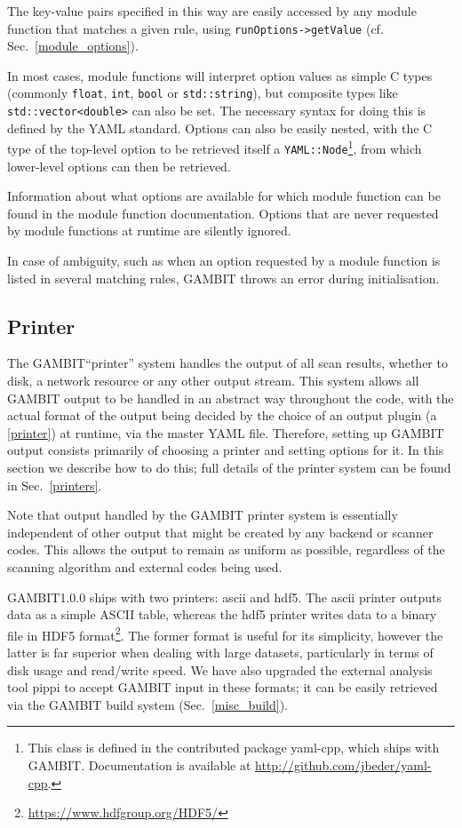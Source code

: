 \documentclass[pdftex,twocolumn,epjc3_preprint,runningheads]{svjour3}
\renewcommand{\_}{\discretionary{\underscore}{}{\underscore}}
\newcommand\cpp[1]{{\lstinline!#1!}}  %
\newcommand{\cross}[1]{\ref{#1}}
\newcommand{\gambit}{\textsf{GAMBIT}\xspace}
\newcommand{\GB}{\gambit}
\newcommand\pippi{\textsf{pippi}\xspace}
\newcommand\xx{\raisebox{0.2ex}{\smaller ++}\xspace}
\newcommand\Cpp{\textsf{C\xx}\xspace}
\newcommand\YAML{\textsf{YAML}\xspace}
\begin{document}
The key-value pairs specified in this way are
easily accessed by any module function that matches a given rule, using
\lstinline{runOptions->getValue} (cf. Sec.~\ref{module_options}).

In most cases, module functions will interpret option values as simple \Cpp types (commonly
\cpp{float}, \cpp{int}, \cpp{bool} or \cpp{std::string}), but composite
types like \cpp{std::vector<double>} can also be set.  The necessary syntax for doing this is defined by the \YAML standard.  Options can also be easily nested, with the \Cpp type of the top-level option to be retrieved itself a \cpp{YAML::Node}\footnote{This class is defined in the contributed package \textsf{yaml-cpp}, which ships with \GB.  Documentation is available at \href{http://github.com/jbeder/yaml-cpp}{http://github.com/jbeder/yaml-cpp}.}, from which lower-level options can then be retrieved.

Information about what options are available for which module function can be
found in the module function documentation.  Options that are never requested by module functions at runtime are silently ignored.

In case of ambiguity, such as when an option requested by a module function is
listed in several matching rules, \GB throws an error during initialisation.

\subsection{Printer}
\label{printer_setup}
%
The \GB ``printer'' system handles the output of all scan results, whether to disk, a network resource or any other output stream.  This system allows all \GB output to be handled in an abstract way throughout the code, with the actual format of the output being decided by the choice of an output plugin (a \cross{printer}) at runtime, via the master \YAML file.  Therefore, setting up \GB output consists primarily of choosing a printer and setting options for it.  In this section we describe how to do this; full details of the printer system can be found in Sec.\ \ref{printers}.

Note that output handled by the \GB printer system is essentially independent of other output that might be created by any backend or scanner codes. This allows the output to remain as uniform as possible, regardless of the scanning algorithm and external codes being used.

\GB \textsf{1.0.0} ships with two printers: \textsf{ascii} and \textsf{hdf5}. The \textsf{ascii} printer outputs data as a simple ASCII table, whereas the \textsf{hdf5} printer writes data to a binary file in \textsf{HDF5} format\footnote{\href{https://www.hdfgroup.org/HDF5/}{https://www.hdfgroup.org/HDF5/}}. The former format is useful for its simplicity, however the latter is far superior when dealing with large datasets, particularly in terms of disk usage and read/write speed. We have also upgraded the external analysis tool \pippi \cite{pippi} to accept \GB input in these formats; it can be easily retrieved via the \GB build system (Sec.\ \ref{misc_build}).
\end{document}
